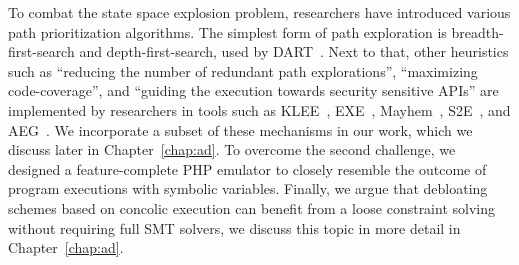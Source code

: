 To combat the state space explosion problem, researchers have introduced various path prioritization algorithms. 
The simplest form of path exploration is breadth-first-search and depth-first-search, used by DART~\cite{godefroid2005dart}. 
Next to that, other heuristics such as ``reducing the number of redundant path explorations'', ``maximizing code-coverage'', and ``guiding the execution towards security sensitive APIs'' are implemented by researchers in tools such as KLEE~\cite{cadar2008klee}, EXE~\cite{cadar2008exe}, Mayhem~\cite{cha2012unleashing}, S2E~\cite{cha2012unleashing}, and AEG~\cite{avgerinos2014automatic}. 
We incorporate a subset of these mechanisms in our work, which we discuss later in Chapter~\ref{chap:ad}. 
To overcome the second challenge, we designed a feature-complete PHP emulator to closely resemble the outcome of program executions with symbolic variables. 
Finally, we argue that debloating schemes based on concolic execution can benefit from a loose constraint solving without requiring full SMT solvers, we discuss this topic in more detail in Chapter~\ref{chap:ad}. 
